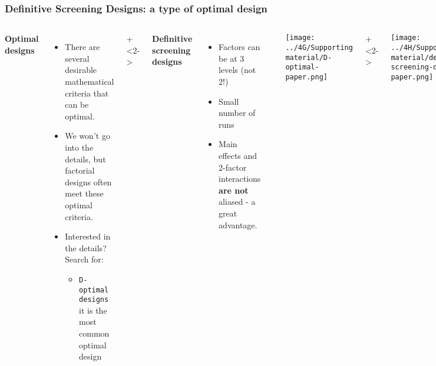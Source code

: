 \begin{frame}\frametitle{Definitive Screening Designs: a type of optimal design}
	\begin{columns}[T]
			\textbf{Optimal designs}
			
			\begin{itemize}
				\item	There are several desirable mathematical criteria that can be optimal.
				\item	We won't go into the details, but factorial designs often meet these optimal criteria.
				
				\item	Interested in the details? Search for:
					\begin{itemize}
						\item	\texttt{D-optimal designs}\\
							it is the most common optimal design
					\end{itemize}
			\end{itemize}
			
			\onslide+<2->{
			\textbf{Definitive screening designs}
				\begin{itemize}
					\item	Factors can be at 3 levels (not 2!)
					\item	Small number of runs
					\item	Main effects and 2-factor interactions \textbf{are not} aliased - a great advantage.
				\end{itemize}
			}
			\rule[3mm]{0.01cm}{90mm}
			
			\centerline{\texttt{[image: ../4G/Supporting material/D-optimal-paper.png]}}
		
			\onslide+<2->{
				\vspace{1cm}
				\centerline{\texttt{[image: ../4H/Supporting material/definitive-screening-design-paper.png]}}
			}
			
	\end{columns}	
\end{frame}

